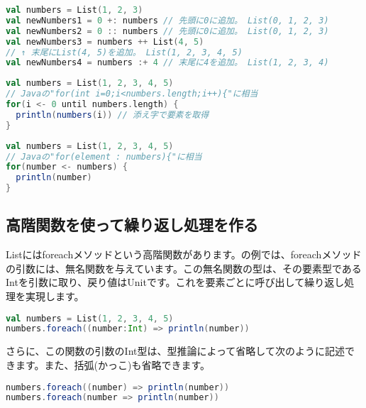 \begin{lstlisting}[language=scala, label=src:add_elements, caption=要素を追加する例]
val numbers = List(1, 2, 3)
val newNumbers1 = 0 +: numbers // 先頭に0に追加。 List(0, 1, 2, 3)
val newNumbers2 = 0 :: numbers // 先頭に0に追加。 List(0, 1, 2, 3)
val newNumbers3 = numbers ++ List(4, 5)
// ↑ 末尾にList(4, 5)を追加。 List(1, 2, 3, 4, 5)
val newNumbers4 = numbers :+ 4 // 末尾に4を追加。 List(1, 2, 3, 4) 
\end{lstlisting}

\begin{lstlisting}[language=scala, label=src:for_statement, caption=Listの各要素を表示する二通りの方法(Javaのfor文に相当する書き方)]
val numbers = List(1, 2, 3, 4, 5)
// Javaの"for(int i=0;i<numbers.length;i++){"に相当
for(i <- 0 until numbers.length) {
  println(numbers(i)) // 添え字で要素を取得
}
\end{lstlisting}

\begin{lstlisting}[language=scala, label=src:ex_for_statement, caption=Listの各要素を表示する二通りの方法(Javaの拡張for文に相当する書き方)]
val numbers = List(1, 2, 3, 4, 5)
// Javaの"for(element : numbers){"に相当
for(number <- numbers) {
  println(number)
} 
\end{lstlisting}

\subsection{高階関数を使って繰り返し処理を作る}
Listにはforeachメソッドという高階関数があります。の例では、foreachメソッドの引数には、無名関数を与えています。この無名関数の型は、その要素型であるIntを引数に取り、戻り値はUnitです。これを要素ごとに呼び出して繰り返し処理を実現します。

\begin{lstlisting}[language=scala, label=src:list_foreach, caption=Listのforeachメソッドを使って要素を表示する]
val numbers = List(1, 2, 3, 4, 5)
numbers.foreach((number:Int) => println(number))
\end{lstlisting}

さらに、この関数の引数のInt型は、型推論によって省略して次のように記述できます。また、括弧(かっこ)も省略できます。

\begin{lstlisting}[language=scala, frame=none]
numbers.foreach((number) => println(number))
numbers.foreach(number => println(number))
\end{lstlisting}

